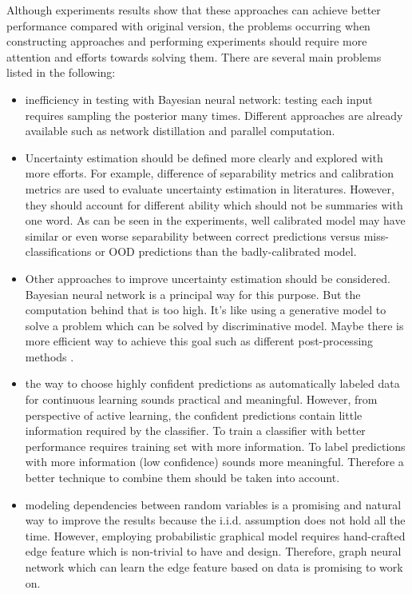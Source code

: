 Although experiments results show that these approaches can achieve better performance compared with original version, the problems occurring when constructing approaches and performing experiments should require more attention and efforts towards solving them. There are several main problems listed in the following:
\begin{itemize}
	\item inefficiency in testing with Bayesian neural network: testing each input requires sampling the posterior many times. Different approaches are already available such as network\cite{hinton2015distilling} distillation and parallel computation.  
	
	\item Uncertainty estimation should be defined more clearly and explored with more efforts. For example, difference of separability metrics and calibration metrics are used to evaluate uncertainty estimation in literatures\cite{hendrycks2016baseline}\cite{guo2017calibration}. However, they should account for different ability which should not be summaries with one word. As can be seen in the experiments, well calibrated model may have similar or even worse separability between correct predictions versus miss-classifications or OOD predictions than the badly-calibrated model. 
	
	\item Other approaches to improve uncertainty estimation should be considered. Bayesian neural network is a principal way for this purpose. But the computation behind that is too high. It's like using a generative model to solve a problem which can be solved by discriminative model. Maybe there is more efficient way to achieve this goal such as different post-processing methods \cite{guo2017calibration}. 
	
	\item the way to choose highly confident predictions as automatically labeled data for continuous learning sounds practical and meaningful. However, from perspective of active learning, the confident predictions contain little information required by the classifier. To train a classifier with better performance requires training set with more information. To label predictions with more information (low confidence) sounds more meaningful. Therefore a better technique to combine them should be taken into account. 
	
	\item modeling dependencies between random variables is a promising and natural way to improve the results because the i.i.d. assumption does not hold all the time. However, employing probabilistic graphical model requires hand-crafted edge feature which is non-trivial to have and design. Therefore, graph neural network which can learn the edge feature based on data is promising to work on.
\end{itemize} 

